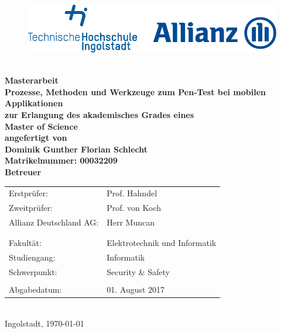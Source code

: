 
\begin{titlepage}

\phantom{tmpText}

\vspace{1cm}

\begin{figure}[h!]
\centering
\includegraphics[width=\textwidth]{bilder/thi_allianz_logo}
\end{figure}

  \begin{center}

    $ $
    \\[3ex]
    \textbf{{\large Masterarbeit} \\[3ex]
    {\LARGE Prozesse, Methoden und Werkzeuge zum Pen-Test bei mobilen Applikationen}\\[6ex]
    zur Erlangung des akademisches Grades eines \\
    Master of Science\\[2ex]
    \vfill
    angefertigt von \\
    Dominik Gunther Florian Schlecht \\
    {\small \normalfont Matrikelnummer: 00032209}\\[2ex] %
    \vfill
    Betreuer} \\[2ex]
    \begin{tabular}{ll}
      Erstprüfer: & Prof. Hahndel \\
      Zweitprüfer: & Prof. von Koch \\
      Allianz Deutschland AG: & Herr Muncan\\
      \\
      \\
      Fakultät: & Elektrotechnik und Informatik\\
      Studiengang: & Informatik\\
      Schwerpunkt: & Security \& Safety\\
      \\
      Abgabedatum: & 01. August 2017
    \end{tabular} \\[2ex]
    \vfill
    Ingolstadt, \today
  \end{center}
\end{titlepage}
